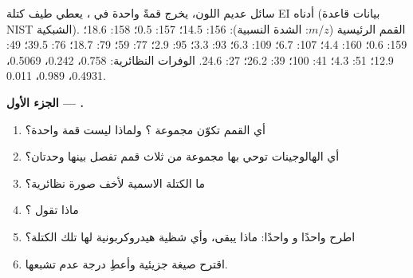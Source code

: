 \begin{problem}
\label{pb:b2:mass-spec-atomic:1}
سائل عديم اللون، يخرج قمةً واحدة في ، يعطي طيف كتلة EI أدناه (بيانات
قاعدة NIST الشبكية). القمم الرئيسية ($m/z$: الشدة النسبية): 156: 14.5؛ 157: 0.5؛ 158: 18.6؛ 159: 0.6؛ 160:
4.4؛ 107: 6.7؛ 109: 6.3؛ 93: 3.3؛ 95: 2.9؛ 77: 59؛ 79: 18.7؛ 76: 39.5؛ 49: 12.9؛ 51: 4.3؛ 41: 100؛ 39:
26.2؛ 27: 24.6. الوفرات النظائرية:  0.758،  0.242،  0.5069،
 0.4931،  0.989،  0.011.

\begin{center}
\end{center}

\medskip
\noindent\textbf{الجزء الأول --- .}
\begin{enumerate}
  \item أي القمم تكوّن مجموعة ؟ ولماذا ليست قمة واحدة؟
  \item أي الهالوجينات توحي بها مجموعة من ثلاث قمم تفصل بينها وحدتان؟
  \item ما الكتلة الاسمية لأخف صورة نظائرية؟
  \item ماذا تقول ؟
  \item اطرح  واحدًا و واحدًا: ماذا يبقى، وأي شظية هيدروكربونية
        لها تلك الكتلة؟
  \item اقترح صيغة جزيئية وأعطِ درجة عدم تشبعها.
\end{enumerate}


\end{problem}
